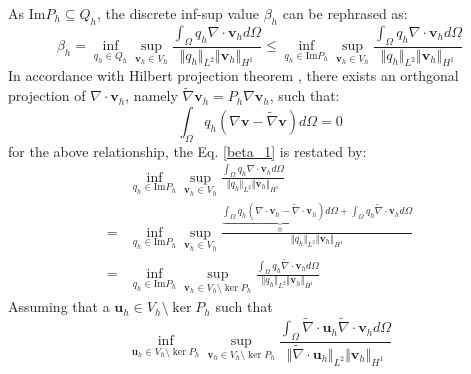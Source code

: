 As $\textrm{Im} P_h \subseteq Q_h$, the discrete inf-sup value $\beta_h$ can be rephrased as:
\begin{equation}\label{beta_1}
\beta_h = \inf_{q_h \in Q_h} \sup_{\boldsymbol v_h \in V_h} \frac{\int_{\Omega} q_h \nabla \cdot \boldsymbol v_h d\Omega}{\Vert q_h \Vert_{L^2} \Vert \boldsymbol v_h \Vert_{H^1}} 
    \le \inf_{q_h \in \textrm{Im} P_h} \sup_{\boldsymbol v_h \in V_h} \frac{\int_{\Omega} q_h \nabla \cdot \boldsymbol v_h d\Omega}{\Vert q_h \Vert_{L^2} \Vert \boldsymbol v_h \Vert_{H^1}} 
\end{equation}
In accordance with Hilbert projection theorem \cite{philippeg.2013}, there exists an orthgonal projection of $\nabla \cdot \boldsymbol v_h$, namely $\tilde \nabla \boldsymbol v_h = P_h \nabla \boldsymbol v_h$, such that: 
\begin{equation}
    \int_\Omega q_h (\nabla \boldsymbol v - \tilde \nabla \boldsymbol v) d\Omega = 0
\end{equation}
for the above relationship, the Eq. \eqref{beta_1} is restated by:
\begin{equation}
\begin{split}
    &\inf_{q_h \in \textrm{Im} P_h} \sup_{\boldsymbol v_h \in V_h} \frac{\int_{\Omega} q_h \nabla \cdot \boldsymbol v_h d\Omega}{\Vert q_h \Vert_{L^2} \Vert \boldsymbol v_h \Vert_{H^1}} \\
    =& \inf_{q_h \in \textrm{Im} P_h} \sup_{\boldsymbol v_h \in V_h} \frac{\underbrace{\int_{\Omega} q_h (\nabla \cdot \boldsymbol v_h - \tilde{\nabla} \cdot \boldsymbol v_h) d\Omega}_{0} + \int_\Omega q_h \tilde{\nabla} \cdot \boldsymbol v_h d\Omega}{\Vert q_h \Vert_{L^2} \Vert \boldsymbol v_h \Vert_{H^1}} \\
    =& \inf_{q_h \in \textrm{Im} P_h} \sup_{\boldsymbol v_h \in V_h\setminus \ker P_h} \frac{\int_\Omega q_h \tilde{\nabla} \cdot \boldsymbol v_h d\Omega}{\Vert q_h \Vert_{L^2} \Vert \boldsymbol v_h \Vert_{H^1}}
\end{split}
\end{equation}
Assuming that a $\boldsymbol u_h \in V_h\setminus \ker P_h$ such that 
\begin{equation}
    \inf_{\boldsymbol u_h \in V_h \setminus \ker P_h} \sup_{\boldsymbol v_h \in V_h\setminus \ker P_h} \frac{\int_\Omega \tilde \nabla \cdot \boldsymbol u_h \tilde{\nabla} \cdot \boldsymbol v_h d\Omega}{\Vert \tilde \nabla \cdot \boldsymbol u_h \Vert_{L^2} \Vert \boldsymbol v_h \Vert_{H^1}}
\end{equation}


